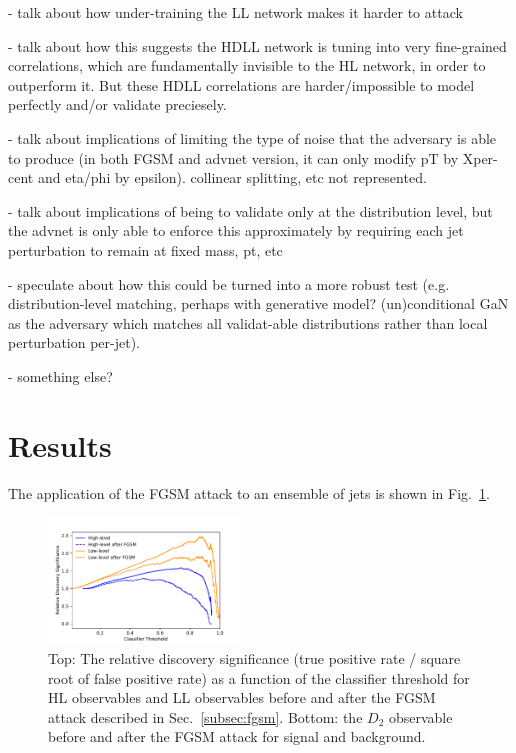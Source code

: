 \documentclass[reprint,nofootinbib,...]{revtex4-1}
\begin{document}
- talk about how under-training the LL network makes it harder to attack

- talk about how this suggests the HDLL network is tuning into very fine-grained correlations, which are fundamentally invisible to the HL network, in order to outperform it. But these HDLL correlations are harder/impossible to model perfectly and/or validate preciesely.

- talk about implications of limiting the type of noise that the adversary is able to produce (in both FGSM and advnet version, it can only modify pT by Xper-cent and eta/phi by epsilon). collinear splitting, etc not represented.

- talk about implications of being to validate only at the distribution level, but the advnet is only able to enforce this approximately by requiring each jet perturbation to remain at fixed mass, pt, etc

- speculate about how this could be turned into a more robust test (e.g. distribution-level matching, perhaps with generative model? (un)conditional GaN as the adversary which matches all validat-able distributions rather than local perturbation per-jet).

- something else?

\section{Results}

The application of the FGSM attack to an ensemble of jets is shown in Fig.~\ref{fig:FGSM2}.  

\begin{figure}[h!]
\centering
\includegraphics[width=0.45\textwidth]{figures/FGSM_Significance.pdf}
\caption{Top: The relative discovery significance (true positive rate / square root of false positive rate) as a function of the classifier threshold for HL observables and LL observables before and after the FGSM attack described in Sec.~\ref{subsec:fgsm}.  Bottom: the $D_2$ observable before and after the FGSM attack for signal and background. }
\label{fig:FGSM2}
\end{figure}
\end{document}

